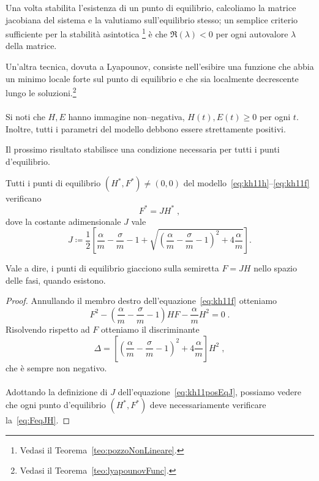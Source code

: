 Una volta stabilita l'esistenza di un punto di equilibrio, calcoliamo la matrice jacobiana del sistema e
la valutiamo sull'equilibrio stesso; un semplice criterio sufficiente per la stabilità asintotica
\footnote{Vedasi il Teorema~\ref{teo:pozzoNonLineare}.}
è che $\Re (\lambda) < 0$ per ogni autovalore $\lambda$ della matrice.

Un'altra tecnica, dovuta a Lyapounov, consiste nell'esibire una funzione che abbia un minimo
locale forte sul punto di equilibrio e che sia localmente decrescente lungo le
soluzioni.\footnote{Vedasi il Teorema~\ref{teo:lyapounovFunc}.}

\paragraph{}
Si noti che $H, E$ hanno immagine non--negativa, \ie $H(t), E(t) \geq 0$ per ogni $t$.
Inoltre, tutti i parametri del modello debbono essere strettamente positivi.

Il prossimo risultato stabilisce una condizione necessaria per tutti i punti d'equilibrio.

\begin{lemma}
    \label{lem:necessJ}
    Tutti i punti di equilibrio $(H^*, F^*) \neq (0,0)$
    del modello~\eqref{eq:kh11h}--\eqref{eq:kh11f} verificano
    \begin{equation}
    F^* = J H^* \; ,
    \label{eq:FeqJH}
    \end{equation}
    dove la costante adimensionale $J$ vale
    \begin{equation}
        J \coloneq \frac{1}{2} \left[
            \frac{\alpha}{m} - \frac{\sigma}{m} - 1 +
            \sqrt{ {\left( \frac{\alpha}{m} - \frac{\sigma}{m} - 1 \right)}^2
                + 4 \frac{\alpha}{m}
            }
        \right].
        \label{eq:kh11posEqJ}
    \end{equation}
\end{lemma}

Vale a dire, i punti di equilibrio giacciono sulla semiretta $F= JH$ nello spazio delle fasi, quando esistono.

\begin{proof}
    Annullando il membro destro dell'equazione~\eqref{eq:kh11f} otteniamo
    $$F^2 - \left( \frac{\alpha}{m} - \frac{\sigma}{m} -1
        \right) H F - \frac{\alpha}{m} H^2 = 0 \; .$$
    Risolvendo rispetto ad $F$ otteniamo il discriminante
    $$\Delta = \left[ {\left( \frac{\alpha}{m} - \frac{\sigma}{m} -1
        \right)}^2 + 4 \frac{\alpha}{m}
        \right] H^2 \; , $$
    che è sempre non negativo.

    \paragraph{}
    Adottando la definizione di $J$ dell'equazione~\eqref{eq:kh11posEqJ}, possiamo vedere
    che ogni punto d'equilibrio $(H^*, F^*)$ deve necessariamente verificare la~\eqref{eq:FeqJH}.
\end{proof}


